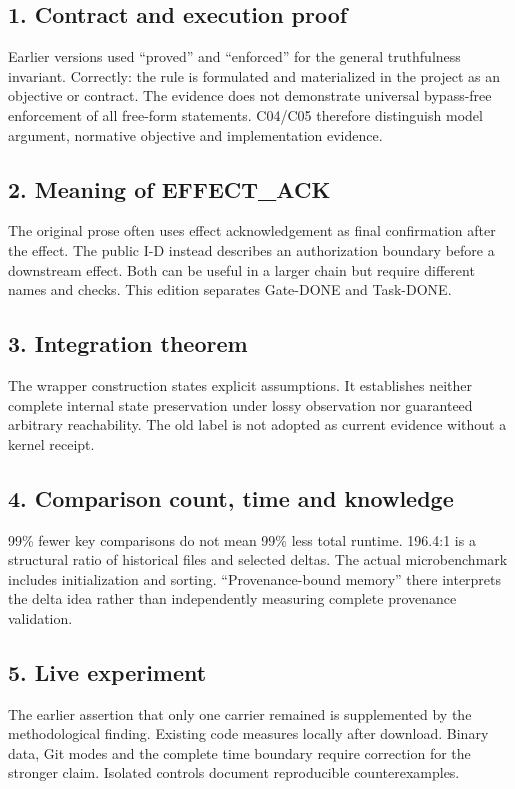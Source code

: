 \begin{cols}
\subsection*{1. Contract and execution proof}
Earlier versions used ``proved'' and ``enforced'' for the general truthfulness invariant. Correctly: the rule is formulated and materialized in the project as an objective or contract. The evidence does not demonstrate universal bypass-free enforcement of all free-form statements. C04/C05 therefore distinguish model argument, normative objective and implementation evidence.

\subsection*{2. Meaning of EFFECT\_ACK}
The original prose often uses effect acknowledgement as final confirmation after the effect. The public I-D instead describes an authorization boundary before a downstream effect. Both can be useful in a larger chain but require different names and checks. This edition separates Gate-DONE and Task-DONE.

\subsection*{3. Integration theorem}
The wrapper construction states explicit assumptions. It establishes neither complete internal state preservation under lossy observation nor guaranteed arbitrary reachability. The old  label is not adopted as current evidence without a kernel receipt.

\subsection*{4. Comparison count, time and knowledge}
99\% fewer key comparisons do not mean 99\% less total runtime. 196.4:1 is a structural ratio of historical files and selected deltas. The actual microbenchmark includes initialization and sorting. ``Provenance-bound memory'' there interprets the delta idea rather than independently measuring complete provenance validation.

\subsection*{5. Live experiment}
The earlier assertion that only one carrier remained is supplemented by the methodological finding. Existing code measures locally after download. Binary data, Git modes and the complete time boundary require correction for the stronger claim. Isolated controls document reproducible counterexamples.


\end{cols}
